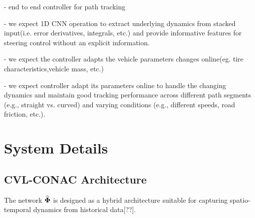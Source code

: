 \documentclass[letterpaper, journal]{IEEEtran}
\begin{document}
- end to end controller for path tracking

- we expect 1D CNN operation to extract underlying 
dynamics from stacked input(i.e. error derivatives, integrals, etc.) and provide informative features for steering control without  an explicit information.

- we expect the controller adapts the vehicle parameters changes online(eg. tire characteristics,vehicle mass, etc.)

- we expect controller adapt its parameters online to handle the changing dynamics and maintain good tracking performance across different path segments (e.g., straight vs. curved) and varying conditions (e.g., different speeds, road friction, etc.).



\section{System Details}

\subsection{CVL-CONAC Architecture}
The network $\widehat{\boldsymbol{\Phi}}$ is designed as a hybrid architecture suitable for capturing spatio-temporal dynamics from historical data[??].
\end{document}
